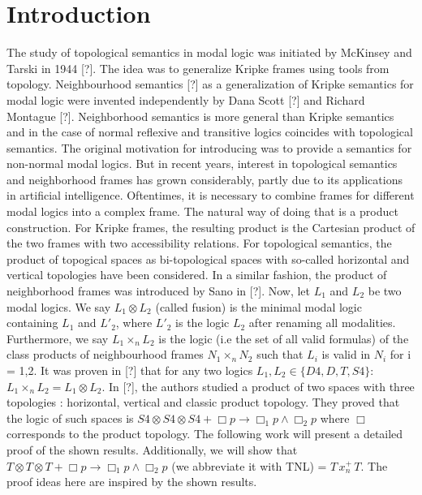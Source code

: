 \documentclass[12pt, a4paper]{scrartcl}
\begin{document}
\section{Introduction}
The study of topological semantics in modal logic was initiated by McKinsey and Tarski in 1944 [?]. The idea was to generalize Kripke frames using tools from topology.
 Neighbourhood semantics [?] as a generalization of Kripke semantics for modal logic were invented independently by Dana Scott [?] and Richard Montague [?].
Neighborhood semantics is more general than Kripke semantics and in the case of normal reflexive and transitive logics coincides with topological semantics.
The original motivation for introducing was to provide a semantics for non-normal modal logics. But in
recent years, interest in topological semantics and neighborhood frames has grown considerably, partly due to its applications in artificial intelligence. \newline
Oftentimes, it is necessary to combine frames for different modal logics into a complex
frame. The natural way of doing that is a product construction. For Kripke frames,
the resulting product is the Cartesian product of the two frames with two accessibility
relations. For topological semantics, the product of topogical spaces as bi-topological
spaces with so-called horizontal and vertical topologies have been considered. In a similar
fashion, the product of neighborhood frames was introduced by Sano in [?]. \newline
Now, let $L_1$ and $L_2$ be two modal logics. We say $L_1\otimes L_2$ (called fusion) is the 
minimal modal logic containing $L_1$ and $L'_2$, where $L'_2$ is the logic $L_2$ after renaming all modalities.
Furthermore, we say $L_1 \times_n L_2$ is the logic (i.e the set of all valid formulas) of the class 
products of neighbourhood frames $N_1 \times_n N_2$ such that $L_i$ is valid in $N_i$ for i = 1,2.
It was proven in [?] that for any two logics $L_1, L_2 \in \{D4,D,T,S4\}: $  $L_1\times_n L_2 = L_1 \otimes L_2$.
In [?], the authors studied a product of two spaces with three topologies : horizontal, vertical and
classic product topology. They proved that the logic of such spaces is $S4 \otimes S4 \otimes S4 + \Box p \rightarrow \Box_1 p \land \Box_2 p$
where $\Box$ corresponds to the product topology. \newline
The following work will present a detailed proof of the shown results. Additionally, we will show that $T\otimes T\otimes T + \Box p \rightarrow \Box_1 p \land \Box_2p$ 
 (we abbreviate it with TNL) = $T \,x^+_n \, T$. The proof ideas here are inspired by the shown results.
 \clearpage
\end{document}
